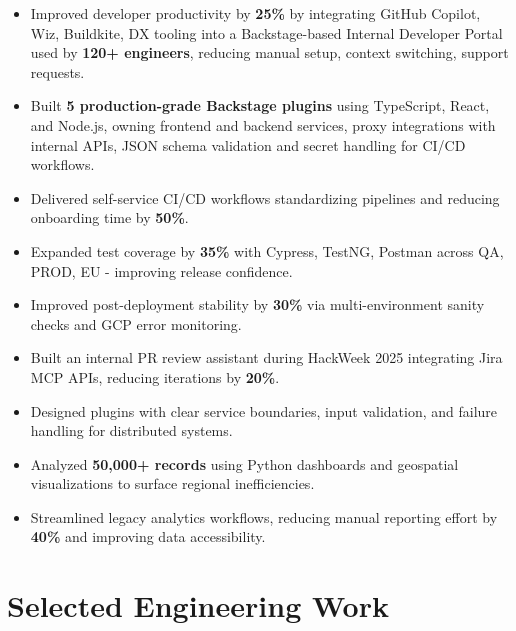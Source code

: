\documentclass[10pt,a4paper]{moderncv}
\begin{document}
\begin{itemize}
\item Improved developer productivity by \textbf{25\%} by integrating GitHub Copilot, Wiz, Buildkite, DX tooling into a Backstage-based Internal Developer Portal used by \textbf{120+ engineers}, reducing manual setup, context switching, support requests.
\item Built \textbf{5 production-grade Backstage plugins} using TypeScript, React, and Node.js, owning frontend and backend services, proxy integrations with internal APIs, JSON schema validation and secret handling for CI/CD workflows.
\item Delivered self-service CI/CD workflows standardizing pipelines and reducing onboarding time by \textbf{50\%}.
\item Expanded test coverage by \textbf{35\%} with Cypress, TestNG, Postman across QA, PROD, EU - improving release confidence.
\item Improved post-deployment stability by \textbf{30\%} via multi-environment sanity checks and GCP error monitoring.
\item Built an internal PR review assistant during HackWeek 2025 integrating Jira MCP APIs, reducing iterations by \textbf{20\%}.
\item Designed plugins with clear service boundaries, input validation, and failure handling for distributed systems.
\end{itemize}
\begin{itemize}
\item Analyzed \textbf{50,000+ records} using Python dashboards and geospatial visualizations to surface regional inefficiencies.
\item Streamlined legacy analytics workflows, reducing manual reporting effort by \textbf{40\%} and improving data accessibility.
\end{itemize}
\section{Selected Engineering Work}
\end{document}
